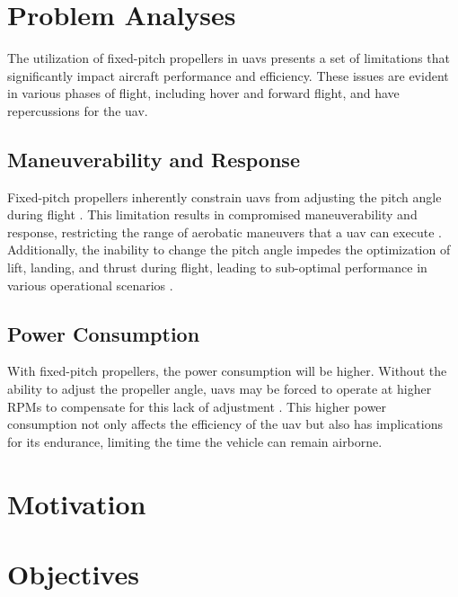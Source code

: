 \section{Problem Analyses}
The utilization of fixed-pitch propellers in \glspl{uav} presents a set of limitations that significantly impact aircraft performance and efficiency.
These issues are evident in various phases of flight, including hover and forward flight, and have repercussions for the \gls{uav}.

\subsection{Maneuverability and Response}
Fixed-pitch propellers inherently constrain \glspl{uav} from adjusting the pitch angle during flight \cite{FPP1}. 
This limitation results in compromised maneuverability and response, restricting the range of aerobatic maneuvers that a \gls{uav} can execute \cite{FPP1}. 
Additionally, the inability to change the pitch angle impedes the optimization of lift, landing, and thrust during flight, leading to sub-optimal performance in various operational scenarios \cite{FPP1}.

\subsection{Power Consumption}
With fixed-pitch propellers, the power consumption will be higher.
Without the ability to adjust the propeller angle, \glspl{uav} may be forced to operate at higher \gls{RPM}s to compensate for this lack of adjustment \cite{FPP1}.
This higher power consumption not only affects the efficiency of the \gls{uav} but also has implications for its endurance, limiting the time the vehicle can remain airborne.\\

\section{Motivation}
\section{Objectives}

